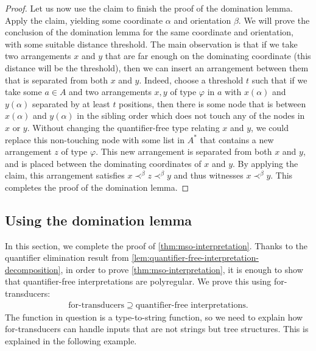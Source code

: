 \begin{proof}
Let us now use the claim to  finish the proof of the domination lemma.  Apply the claim, yielding some coordinate $\alpha$ and orientation $\beta$. We will prove the conclusion of the  domination lemma for the same coordinate and orientation, with some suitable distance threshold. The main observation is that  if we take two arrangements $x$ and $y$ that are far enough on the dominating coordinate (this distance will be the threshold), then we can insert an arrangement between them that is separated from both $x$ and $y$. Indeed, choose a threshold $t$ such that if we take some $a \in A$ and two arrangements $x,y$ of type $\varphi$ in $a$ with $x(\alpha)$ and $y(\alpha)$ separated by at least $t$ positions, then there is some node that is  between $x(\alpha)$ and $y(\alpha)$ in the sibling order which does not touch any of the nodes in $x$ or $y$. Without changing the  quantifier-free type relating  $x$ and $y$, we could replace this non-touching node with some list in $A^*$ that contains a new arrangement $z$ of type $\varphi$. This new arrangement is separated from both $x$ and $y$, and  is placed between the dominating coordinates of $x$ and $y$. By applying the claim, this arrangement satisfies $x \prec^\beta z \prec^\beta y$ and thus witnesses $x \prec^\beta y$. This completes the proof of the domination lemma.
\end{proof}



\subsection{Using the domination lemma}
\label{sec:using-domination-lemma}
In this section, we complete the proof of \cref{thm:mso-interpretation}.
Thanks to the quantifier elimination result from \cref{lem:quantifier-free-interpretation-decomposition}, in order to prove \cref{thm:mso-interpretation}, it is enough to show that quantifier-free interpretations are polyregular. We  prove this using for-transducers:
\begin{align*}
\text{for-transducers} \supseteq \text{quantifier-free interpretations}. 
\end{align*}
The function in question is a type-to-string function, so we need to explain how  for-transducers can handle inputs that are not strings but tree structures. This is  explained in the following example.

